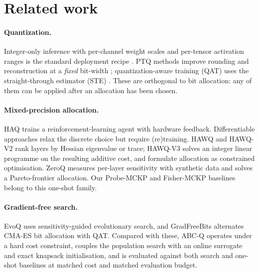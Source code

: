 \documentclass[11pt,a4paper]{article}
\begin{document}
\section{Related work}

\paragraph{Quantization.} Integer-only inference with per-channel weight scales and per-tensor
activation ranges is the standard deployment recipe \citep{Jacob2018,Krishnamoorthi2018,Nagel2021White}.
PTQ methods improve rounding and reconstruction at a \emph{fixed} bit-width
\citep{Banner2019,Nagel2020AdaRound,Li2021BRECQ}; quantization-aware training (QAT) uses the
straight-through estimator (STE) \citep{Bengio2013STE,Esser2020LSQ}. These are orthogonal to bit
allocation: any of them can be applied after an allocation has been chosen.

\paragraph{Mixed-precision allocation.} HAQ \citep{Wang2019HAQ} trains a reinforcement-learning agent
with hardware feedback. Differentiable approaches relax the discrete choice
\citep{Wu2018DNAS,Cai2020EdMIPS,Uhlich2020,vanBaalen2020} but require (re)training. HAWQ
\citep{Dong2019HAWQ} and HAWQ-V2 \citep{Dong2020HAWQV2} rank layers by Hessian eigenvalue or trace;
HAWQ-V3 \citep{Yao2021HAWQV3} solves an integer linear programme on the resulting additive cost, and
\citet{Chen2021Constrained} formulate allocation as constrained optimisation. ZeroQ \citep{Cai2020ZeroQ}
measures per-layer sensitivity with synthetic data and solves a Pareto-frontier allocation. Our
Probe-MCKP and Fisher-MCKP baselines belong to this one-shot family.

\paragraph{Gradient-free search.} EvoQ \citep{Yuan2020EvoQ} uses sensitivity-guided evolutionary
search, and GradFreeBits \citep{Bodner2022GradFreeBits} alternates CMA-ES \citep{Hansen2001CMA} bit
allocation with QAT. Compared with these, ABC-Q operates under a hard cost constraint, couples the
population search with an online surrogate and exact knapsack initialisation, and is evaluated
against both search and one-shot baselines at matched cost and matched evaluation budget.
\end{document}

